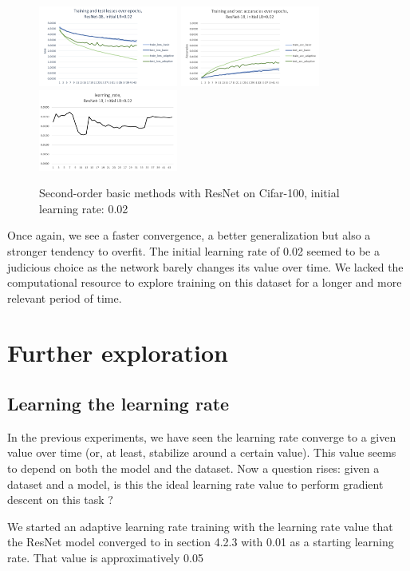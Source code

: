 \documentclass{article}
\begin{document}
  \begin{figure}[!h]
	\includegraphics[width=130pt]{loss_resnet_100_0_02.png}
	\includegraphics[width=130pt]{acc_resnet_100_0_02.png}
	\includegraphics[width=130pt]{lr_resnet_100_0_02.png}
	\caption{Second-order basic methods with ResNet on Cifar-100, initial learning rate: 0.02}
  \end{figure}
  
  Once again, we see a faster convergence, a better generalization but also a stronger tendency to overfit. The initial learning rate of 0.02 seemed to be a judicious choice as the network barely changes its value over time. We lacked the computational resource to explore training on this dataset for a longer and more relevant period of time. 
  
  \section{Further exploration}
  
  \subsection{Learning the learning rate}
  
  In the previous experiments, we have seen the learning rate converge to a given value over time (or, at least, stabilize around a certain value). This value seems to depend on both the model and the dataset. Now a question rises: given a dataset and a model, is this the ideal learning rate value to perform gradient descent on this task ?
  
  We started an adaptive learning rate training with the learning rate value that the ResNet model converged to in section 4.2.3 with 0.01 as a starting learning rate. That value is approximatively 0.05
  
\end{document}
